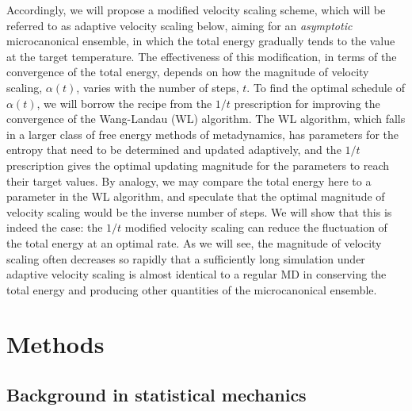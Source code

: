 \documentclass[reprint]{revtex4-1}
\begin{document}
Accordingly,
we will propose a modified velocity scaling scheme,
which will be referred to as adaptive velocity scaling below,
aiming for an \emph{asymptotic} microcanonical ensemble,
in which
the total energy gradually tends to the value
at the target temperature.
%
The effectiveness of this modification,
in terms of the convergence of the total energy,
depends on how
the magnitude of velocity scaling, $\alpha(t)$,
varies with the number of steps, $t$.
%
To find the optimal schedule of $\alpha(t)$,
we will borrow the recipe from the $1/t$ prescription\cite{
  belardinelli2007, *belardinelli2007jcp, *belardinelli2008,
  zhou2005, *zhou2008, *morozov2007}
for improving the convergence of
the Wang-Landau (WL) algorithm\cite{
  wang2001, *wang2001pre}.
%
The WL algorithm,
which falls in a larger class of free energy methods
of metadynamics\cite{
  laio2002, laio2008, marsili2006},
has parameters for the entropy that need to be
determined and updated adaptively,
and the $1/t$ prescription gives the optimal updating magnitude
for the parameters to reach their target values.
%
By analogy, we may compare the total energy here
to a parameter in the WL algorithm,
and speculate that the optimal magnitude
of velocity scaling would be
the inverse number of steps.
%
We will show that this is indeed the case:
the $1/t$ modified velocity scaling can reduce
the fluctuation of the total energy
at an optimal rate.
%
%
As we will see,
the magnitude of velocity scaling
often decreases so rapidly that
a sufficiently long simulation under adaptive velocity scaling
is almost identical to a regular MD
in conserving the total energy and producing other quantities
of the microcanonical ensemble.



\section{Methods}



\subsection{Background in statistical mechanics}
\end{document}
